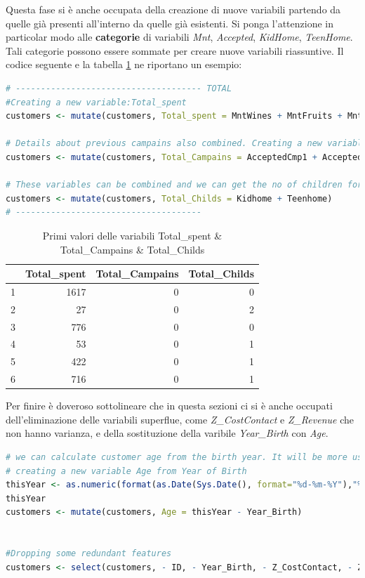 \documentclass[letterpaper,11pt]{article}
\begin{document}
Questa fase si è anche occupata della creazione di nuove variabili partendo da quelle già presenti all'interno da quelle già esistenti. Si ponga l'attenzione in particolar modo alle \textbf{categorie} di variabili \textit{Mnt}, \textit{Accepted}, \textit{KidHome}, \textit{TeenHome}. Tali categorie possono essere sommate per creare nuove variabili riassuntive. Il codice seguente e la tabella \ref{fig:Totalspent&TotalCampains&TotalChilds} ne riportano un esempio:
\begin{lstlisting}[language=R]
# ------------------------------------- TOTAL
#Creating a new variable:Total_spent
customers <- mutate(customers, Total_spent = MntWines + MntFruits + MntMeatProducts + MntFishProducts + MntSweetProducts + MntGoldProds)

# Details about previous campains also combined. Creating a new variable:Total_Campains
customers <- mutate(customers, Total_Campains = AcceptedCmp1 + AcceptedCmp2 + AcceptedCmp3 + AcceptedCmp4 + AcceptedCmp5)

# These variables can be combined and we can get the no of children for the customers. Creating a new variable:Total_Childs
customers <- mutate(customers, Total_Childs = Kidhome + Teenhome)
# ------------------------------------- 
\end{lstlisting}
\begin{table}[h!t]
\centering
\begin{tabular}{rrrr}
  \hline
 & Total\_spent & Total\_Campains & Total\_Childs \\ 
  \hline
1 & 1617 &   0 &   0 \\ 
  2 &  27 &   0 &   2 \\ 
  3 & 776 &   0 &   0 \\ 
  4 &  53 &   0 &   1 \\ 
  5 & 422 &   0 &   1 \\ 
  6 & 716 &   0 &   1 \\ 
   \hline
\end{tabular}
\caption{Primi valori delle variabili Total\_spent \& Total\_Campains \& Total\_Childs}
\label{fig:Totalspent&TotalCampains&TotalChilds}
\end{table}

Per finire è doveroso sottolineare che in questa sezioni ci si è anche occupati dell'eliminazione delle variabili superflue, come \textit{Z\_CostContact} e \textit{Z\_Revenue} che non hanno varianza, e della sostituzione della varibile \textit{Year\_Birth} con \textit{Age}.
\begin{lstlisting}[language=R]
# we can calculate customer age from the birth year. It will be more usefull to our analysis.
# creating a new variable Age from Year of Birth 
thisYear <- as.numeric(format(as.Date(Sys.Date(), format="%d-%m-%Y"),"%Y"))
thisYear
customers <- mutate(customers, Age = thisYear - Year_Birth)


#Dropping some redundant features
customers <- select(customers, - ID, - Year_Birth, - Z_CostContact, - Z_Revenue, -Dt_Customer)
\end{lstlisting}
\end{document}
